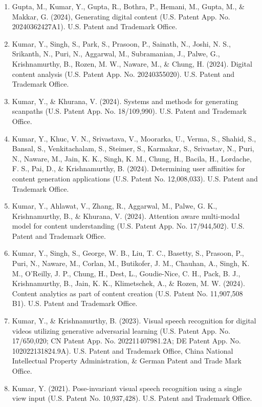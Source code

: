 \begin{enumerate}
    \item Gupta, M., Kumar, Y., Gupta, R., Bothra, P., Hemani, M., Gupta, M., \& Makkar, G. (2024), Generating digital content (U.S. Patent App. No. 20240362427A1). U.S. Patent and Trademark Office.

    \item Kumar, Y., Singh, S., Park, S., Prasoon, P., Sainath, N., Joshi, N. S., Srikanth, N., Puri, N., Aggarwal, M., Subramanian, J., Palwe, G., Krishnamurthy, B., Rozen, M. W., Naware, M., \& Chung, H. (2024). Digital content analysis (U.S. Patent App. No. 20240355020). U.S. Patent and Trademark Office.

    \item Kumar, Y., \& Khurana, V. (2024). Systems and methods for generating scanpaths (U.S. Patent App. No. 18/109,990). U.S. Patent and Trademark Office.

    \item Kumar, Y., Khuc, V. N., Srivastava, V., Moorarka, U., Verma, S., Shahid, S., Bansal, S., Venkitachalam, S., Steimer, S., Karmakar, S., Srivastav, N., Puri, N., Naware, M., Jain, K. K., Singh, K. M., Chung, H., Bacila, H., Lordache, F. S., Pai, D., \& Krishnamurthy, B. (2024). Determining user affinities for content generation applications (U.S. Patent No. 12,008,033). U.S. Patent and Trademark Office.

    \item Kumar, Y., Ahlawat, V., Zhang, R., Aggarwal, M., Palwe, G. K., Krishnamurthy, B., \& Khurana, V. (2024). Attention aware multi-modal model for content understanding (U.S. Patent App. No. 17/944,502). U.S. Patent and Trademark Office.
    
    \item Kumar, Y., Singh, S., George, W. B., Liu, T. C., Basetty, S., Prasoon, P., Puri, N., Naware, M., Corlan, M., Butikofer, J. M., Chauhan, A., Singh, K. M., O'Reilly, J. P., Chung, H., Dest, L., Goudie-Nice, C. H., Pack, B. J., Krishnamurthy, B., Jain, K. K., Klimetschek, A., \& Rozen, M. W. (2024). Content analytics as part of content creation (U.S. Patent No. 11,907,508 B1). U.S. Patent and Trademark Office.
    
    \item Kumar, Y., \& Krishnamurthy, B. (2023). Visual speech recognition for digital videos utilizing generative adversarial learning (U.S. Patent App. No. 17/650,020; CN Patent App. No. 202211407981.2A; DE Patent App. No. 102022131824.9A). U.S. Patent and Trademark Office, China National Intellectual Property Administration, \& German Patent and Trade Mark Office.

    \item Kumar, Y. (2021). Pose-invariant visual speech recognition using a single view input (U.S. Patent No. 10,937,428). U.S. Patent and Trademark Office.

\end{enumerate}


